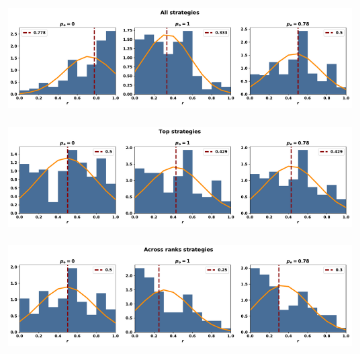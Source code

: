 \begin{table}[!htbp]
    \begin{center}
    \resizebox{.9\textwidth}{!}{
        
    }
\end{center}
\end{table}


\begin{figure}[!htbp]
    \begin{subfigure}{\textwidth}
    \includegraphics[width=\textwidth]{src/chapters/07/img/normalised_rank_classification_all_strategies.pdf}
    \end{subfigure}
    \par\bigskip
    \begin{subfigure}{\textwidth}
    \includegraphics[width=\textwidth]{src/chapters/07/img/normalised_rank_classification_top_strategies.pdf}
    \end{subfigure}
    \par\bigskip
    \begin{subfigure}{\textwidth}
    \includegraphics[width=\textwidth]{src/chapters/07/img/normalised_rank_classification_across_ranks_strategies.pdf}

\end{subfigure}
\end{figure}
